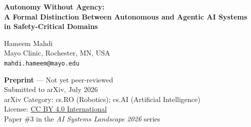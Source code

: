 \documentclass[12pt, a4paper]{article}
\begin{document}
\begin{center}
    {\Large\bfseries Autonomy Without Agency:\\[4pt]
    A Formal Distinction Between Autonomous and Agentic AI Systems\\[2pt]
    in Safety-Critical Domains}

    \vspace{1em}

    {\large Hameem Mahdi~}\\[4pt]
    Mayo Clinic, Rochester, MN, USA\\
    \texttt{mahdi.hameem@mayo.edu}

    \vspace{1em}

    {\small\textbf{Preprint} — Not yet peer-reviewed}\\[2pt]
    {\small Submitted to arXiv, July 2026}\\[2pt]
    {\small arXiv Category: cs.RO (Robotics); cs.AI (Artificial Intelligence)}\\[2pt]
    {\small License: \href{https://creativecommons.org/licenses/by/4.0/}{CC BY 4.0 International}}\\[2pt]
    {\small Paper \#3 in the \emph{AI Systems Landscape 2026} series}
\end{center}

\vspace{1em}
\end{document}
